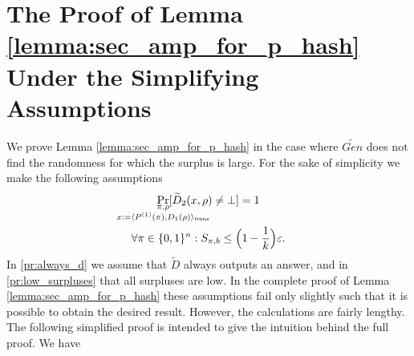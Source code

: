 \section{The Proof of Lemma \ref{lemma:sec_amp_for_p_hash} Under the Simplifying Assumptions}
\label{st:proofSimAssm}
We prove Lemma \ref{lemma:sec_amp_for_p_hash} in the case where $\widetilde{Gen}$ does not find the randomness for which the surplus is large.
For the sake of simplicity we make the following assumptions
\begin{gather}
  \label{pr:always_d}
\underset{
  \mathclap{
  \substack{\pi, \rho \\ x := \langle P^{(1)}(\pi), D_1(\rho) \rangle_{\trans}}}}
{\Pr}[\widetilde{D}_2(x,\rho) \neq \bot] = 1 \\
  \label{pr:low_surpluses}
\forall \pi \in \{0,1\}^{n} : S_{\pi, b} \leq \Big(1 - \frac{1}{k}\Big)\epsilon.
\end{gather}
In \eqref{pr:always_d} we assume that $\widetilde{D}$ always outputs an answer, and in \eqref{pr:low_surpluses} that all surpluses are low.
In the complete proof of Lemma \ref{lemma:sec_amp_for_p_hash} these assumptions fail only slightly such that it is possible
to obtain the desired result. However, the calculations are fairly lengthy.
The following simplified proof is intended to give the intuition behind the full proof.
We have
